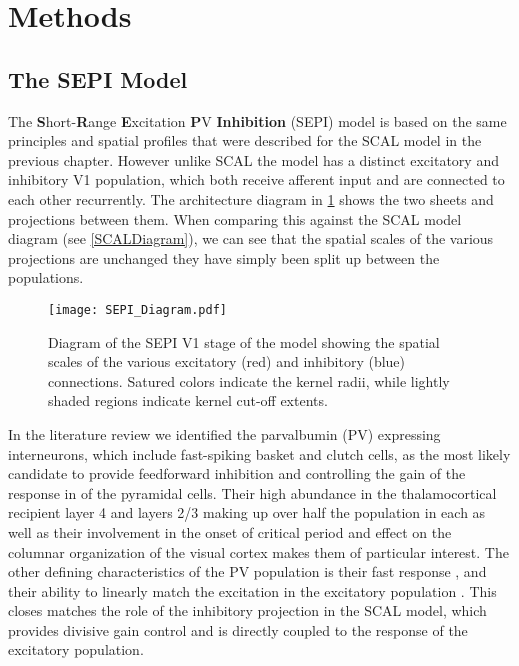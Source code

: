 \section{Methods}

\subsection{The SEPI Model}

The \textbf{S}hort-\textbf{R}ange \textbf{E}xcitation \textbf{P}V
\textbf{Inhibition} (SEPI) model is based on the same principles and
spatial profiles that were described for the SCAL model in the
previous chapter. However unlike SCAL the model has a distinct
excitatory and inhibitory V1 population, which both receive afferent
input and are connected to each other recurrently. The architecture
diagram in \ref{SEPIDiagram} shows the two sheets and projections
between them. When comparing this against the SCAL model diagram (see
\ref{SCALDiagram}), we can see that the spatial scales of the various
projections are unchanged they have simply been split up between the
populations.

\begin{figure}
	\centering
        \texttt{[image: SEPI\_Diagram.pdf]}
	\caption{Diagram of the SEPI V1 stage of the model showing the
          spatial scales of the various excitatory (red) and
          inhibitory (blue) connections. Satured colors indicate the
          kernel radii, while lightly shaded regions indicate kernel
          cut-off extents.}
	\label{SEPIDiagram}
\end{figure}

In the literature review we identified the parvalbumin (PV) expressing
interneurons, which include fast-spiking basket and clutch cells, as
the most likely candidate to provide feedforward inhibition and
controlling the gain of the response in of the pyramidal cells. Their
high abundance in the thalamocortical recipient layer 4 and layers 2/3
making up over half the population in each \citep{VanBrederode1990} as
well as their involvement in the onset of critical period
\citep{Fagiolini2000} and effect on the columnar organization of the
visual cortex \citep{Hensch2004} makes them of particular interest. The
other defining characteristics of the PV population is their fast
response \citep{Cruikshank2007,Gabernet2005}, and their ability to
linearly match the excitation in the excitatory population
\citep{Atallah2012}. This closes matches the role of the inhibitory
projection in the SCAL model, which provides divisive gain control and
is directly coupled to the response of the excitatory population.

